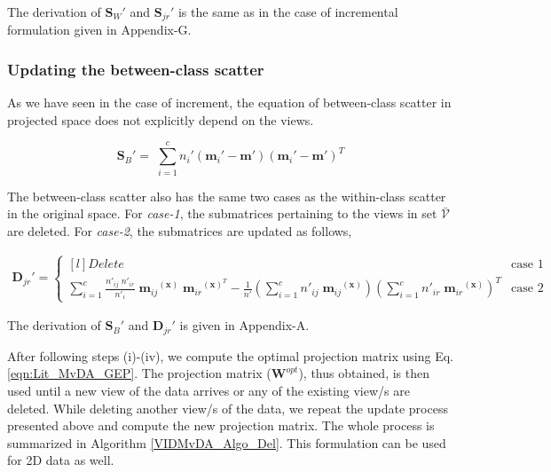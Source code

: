 The derivation of $\textbf{S}_{W}'$ and $\textbf{S}_{jr}'$ is the same as in the case of incremental formulation given in Appendix-G.%




\subsubsection{Updating the between-class scatter}
\label{ssubs:VIDMvDA_Dec_Sb}
As we have seen in the case of increment, the equation of between-class scatter in projected space does not explicitly depend on the views.

\begin{equation}
\label{eqn:VIDMvDA_Del_Sb}
\textbf{S}_B' = \; \sum_{i=1}^{c} n_{i}' (\textbf{m}_{i}' - \textbf{m}') (\textbf{m}_{i}' - \textbf{m}')^T
\end{equation}

The between-class scatter also has the same two cases as the within-class scatter in the original space. For \textit{case-1}, the submatrices pertaining to the views in set $\bar{\mathcal{V}}$ are deleted. For \textit{case-2}, the submatrices are updated as follows,

\small
\begin{equation}
\label{eqn:VIDMvDA_Del_Djr}
\begin{split}
\textbf{D}_{jr}' = \left\{\begin{matrix*}[l]
Delete & \text{case 1}
\\[0.4cm]
\sum\limits_{i=1}^{c} \frac{n'_{ij} \; n'_{ir}}{n'_i} \; {\textbf{m}_{ij}}^{(\textbf{x})} \; {\textbf{m}_{ir}}^{(\textbf{x})^T} - \frac{1}{n'} \left ( \sum\limits_{i=1}^{c} n'_{ij} \; {\textbf{m}_{ij}}^{(\textbf{x})} \right )\left ( \sum\limits_{i=1}^{c} n'_{ir} \; {\textbf{m}_{ir}}^{(\textbf{x})} \right )^T & \text{case 2}
\end{matrix*}\right.
\end{split}
\end{equation}
\normalsize

The derivation of $\textbf{S}_{B}'$ and $\textbf{D}_{jr}'$ is given in Appendix-A.%

After following steps (i)-(iv), we compute the optimal projection matrix using Eq. \ref{eqn:Lit_MvDA_GEP}. The projection matrix ($\textbf{W}^{opt}$), thus obtained, is then used until a new view of the data arrives or any of the existing view/s are deleted. While deleting another view/s of the data, we repeat the update process presented above and compute the new projection matrix. The whole process is summarized in Algorithm \ref{VIDMvDA_Algo_Del}. This formulation can be used for 2D data as well.










